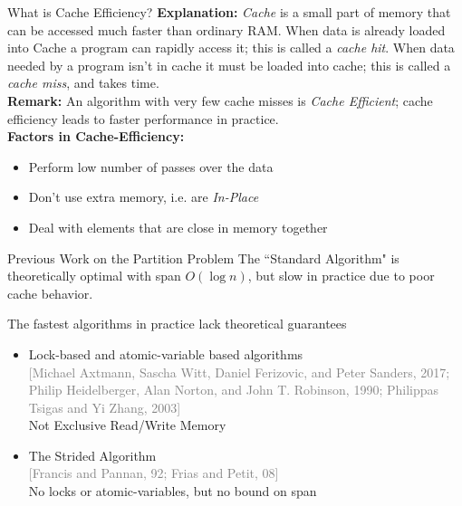 \documentclass[table,serif,mathserif,final]{beamer}
\newcommand{\citefont}[1]{{\huge \textcolor{gray}{#1}}}
\theoremstyle{remark}
\begin{document}
\begin{frame}
\begin{block}{\Huge What is Cache Efficiency?}
  \justifying
  \Huge
  \textbf{Explanation:} \emph{Cache} is a small part of memory that can be accessed much faster than ordinary RAM. When data is already loaded into Cache a program can rapidly access it; this is called a \emph{cache hit}. When data needed by a program isn't in cache it must be loaded into cache; this is called a \emph{cache miss}, and takes time. \\
  \textbf{Remark:} An algorithm with very few cache misses is \emph{Cache Efficient}; cache efficiency leads to faster performance in practice.\\
  \textbf{Factors in Cache-Efficiency:}
  \begin{itemize}
    \item Perform low number of passes over the data
    \item Don't use extra memory, i.e. are \emph{In-Place}
    \item Deal with elements that are close in memory together
  \end{itemize}
\end{block}
\vspace{1cm}

\begin{block}{\Huge Previous Work on the Partition Problem}
  \justifying
  \Huge
  The ``Standard Algorithm" is {\color{darkgreen} theoretically optimal with span $O(\log n)$,} {\color{red} but slow in practice due to poor cache behavior.}

  The {\color{darkgreen}fastest algorithms in practice} {\color{red}lack theoretical guarantees}
  \begin{itemize}
    \item Lock-based and atomic-variable based algorithms\\ \citefont{[Michael Axtmann, Sascha Witt, Daniel Ferizovic, and Peter Sanders, 2017; Philip Heidelberger, Alan Norton, and John T. Robinson, 1990; Philippas Tsigas and Yi Zhang, 2003]}\\
      {\color{red} Not Exclusive Read/Write Memory}
    \item The Strided Algorithm\\ \citefont{[Francis and Pannan, 92; Frias and Petit, 08]}\\ 
      {\color{darkgreen}No locks or atomic-variables,} {\color{red}but no bound on span}
  \end{itemize}
  \vspace{0.2cm}
\end{block}

\end{frame}
\end{document}
